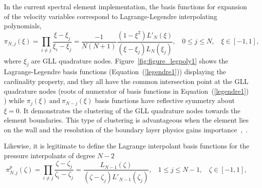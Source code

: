 \documentclass[times]{fldauth}
\begin{document}
In the current spectral element implementation, the basis functions for expansion of the velocity variables correspond to Lagrange-Legendre interpolating polynomials,
\begin{equation}
\pi_{N,j}(\xi) = \prod_{i\neq j}\frac{\xi - \xi_j}{\xi_i - \xi_j} =  \frac{-1}{N(N+1)}\frac{(1-\xi^{2})L'_{N}(\xi)}{(\xi - \xi_j)L_N(\xi_j)}, \ \  \  \   0 \leq j \leq N, \  \  \ \  \xi \in [-1,1],  \label{legendre1}
\end{equation}
where $\xi_j$ are GLL quadrature nodes. Figure~\ref{fig:figure_legpoly1} shows the Lagrange-Legendre basis functions (Equation~(\ref{legendre1})) displaying the cardinality property, and they all have the common intersection point at the GLL quadrature nodes (roots of numerator of basis functions in Equation~(\ref{legendre1}) ) while $\pi_{j}(\xi) \ \mbox{and} \ \pi_{N-j}(\xi)$ basis functions have reflective symmetry about $\xi = 0$. It demonstrates the clustering of the GLL quadrature nodes towards the element boundaries. This type of clustering is advantageous when the element lies on the wall and the resolution of the boundary layer physics gains importance~\cite{schlichting},~\cite{deville}.


Likewise, it is legitimate to define the Lagrange interpolant basis functions for the pressure interpolants of degree $N-2$~\cite{fischer_jcp, deville}
\begin{equation}
\pi^{p}_{N,j}(\zeta) = \prod_{i\neq j}\frac{\zeta - \zeta_j}{\zeta_i - \zeta_j} = \frac{L_{N-1}(\zeta)}{(\zeta - \zeta_j)L'_{N-1}(\zeta_j)} , \ \  \  \   1 \leq j \leq N-1, \  \  \ \  \zeta \in [-1,1],  \label{legendre1}
\end{equation} 
\par
\end{document}
